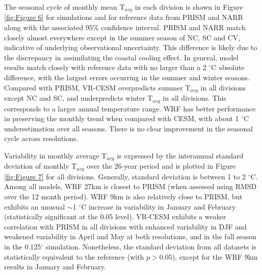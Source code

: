 \documentclass[draft,ms]{agutex}   %
\begin{document}
\begin{article}
The seasonal cycle of monthly mean T$_{avg}$ in each division is shown in Figure \ref{fig:Figure 6} for simulations and for reference data from PRISM and NARR along with the associated 95\% confidence interval. PRISM and NARR match closely almost everywhere except in the summer season of NC, SC and CV, indicative of underlying observational uncertainty. This difference is likely due to the discrepancy in assimilating the coastal cooling effect.  In general, model results match closely with reference data with no larger than a 2 $^\circ$C absolute difference, with the largest errors occurring in the summer and winter seasons.  Compared with PRISM, VR-CESM overpredicts summer T$_{avg}$ in all divisions except NC and SC, and underpredicts winter T$_{avg}$ in all divisions.  This corresponds to a larger annual temperature range. WRF has better performance in preserving the monthly trend when compared with CESM, with about 1 $^\circ$C underestimation over all seasons. There is no clear improvement in the seasonal cycle across resolutions.

Variability in monthly average T$_{avg}$ is expressed by the interannual standard deviation of monthly T$_{avg}$ over the 26-year period and is plotted in Figure \ref{fig:Figure 7} for all divisions. Generally, standard deviation is between 1 to 2 $^\circ$C. Among all models, WRF 27km is closest to PRISM (when assessed using RMSD over the 12 month period). WRF 9km is also relatively close to PRISM, but exhibits an unusual $\sim$1 $^\circ$C increase in variability in January and February (statistically significant at the 0.05 level). VR-CESM exhibits a weaker correlation with PRISM in all divisions with enhanced variability in DJF and weakened variability in April and May at both resolutions, and in the fall season in the 0.125$^\circ$ simulation. Nonetheless, the standard deviation from all datasets is statistically equivalent to the reference (with $p > 0.05$), except for the WRF 9km results in January and February.


\end{article}
\end{document}
